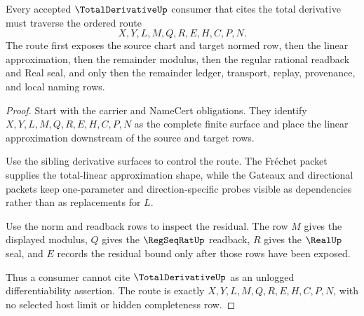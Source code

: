\begin{theorem}
\label{thm:total-derivative-linear-approximation-route}
Every accepted $\TotalDerivativeUp$ consumer that cites the total derivative must traverse the ordered route
$$
X,Y,L,M,Q,R,E,H,C,P,N.
$$
The route first exposes the source chart and target normed row, then the linear approximation, then the remainder modulus, then the regular rational readback and Real seal, and only then the remainder ledger, transport, replay, provenance, and local naming rows.
\end{theorem}
\begin{proof}
Start with the carrier and NameCert obligations. They identify $X,Y,L,M,Q,R,E,H,C,P,N$ as the complete finite surface and place the linear approximation downstream of the source and target rows.

Use the sibling derivative surfaces to control the route. The Fréchet packet supplies the total-linear approximation shape, while the Gateaux and directional packets keep one-parameter and direction-specific probes visible as dependencies rather than as replacements for $L$.

Use the norm and readback rows to inspect the residual. The row $M$ gives the displayed modulus, $Q$ gives the $\RegSeqRatUp$ readback, $R$ gives the $\RealUp$ seal, and $E$ records the residual bound only after those rows have been exposed.

Thus a consumer cannot cite $\TotalDerivativeUp$ as an unlogged differentiability assertion. The route is exactly $X,Y,L,M,Q,R,E,H,C,P,N$, with no selected host limit or hidden completeness row.
\end{proof}




